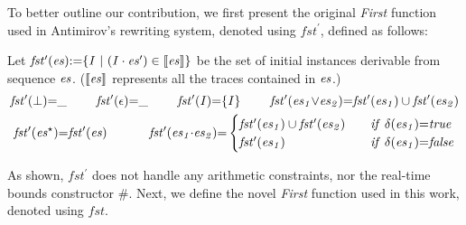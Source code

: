 \documentclass[acmsmall,10pt,review]{acmart}
\newcommand{\es}{\textcolor{black}{\ensuremath{{es}}}}
\newcommand{\seq}{\cdot}
\newcommand{\code}[1]{{\tt{\ensuremath{\m{#1}}}}}
\newcommand{\esn}[2]{\ensuremath{#1^{#2}}}
\newcommand{\empt}{\textcolor{black}{\ensuremath{\epsilon}}}
\newcommand{\bott}{\textcolor{black}{\ensuremath{\bot}}}
\newcommand{\m}{\mathit}
\begin{document}
To better outline our contribution, we first present the original \emph{First} function used in  Antimirov's rewriting system, denoted using \code{fst^\prime}, defined as follows:

\begin{definition}\label{First1}
Let \code{fst^\prime(\es){:=}\{ I\ |\  (I \cdot \es^\prime) \in \llbracket  \es \rrbracket  \}} be the set of initial instances derivable from  sequence \code{\es}. (\code{\llbracket  \es \rrbracket } represents all the traces contained in \code{\es}.)
{ 
 \begin{gather*} 
\code{fst^\prime( \bott) {=} \_ } \qquad\ 
\code{ fst^\prime(\empt) {=} \_} \qquad\ 
\code{fst^\prime( I) {=} \{ I \} }
 \qquad\ 
\code{fst^\prime(  \es_1 {\vee} \es_2) {=} fst^\prime(  \es_1) \cup fst^\prime(  \es_2)}
\\
{
\code{fst^\prime( \esn{\es}{\star} ) {=} fst^\prime({ \es})} 
\qquad\quad\
\code{fst^\prime(\es_1 {\seq} \es_2) {=} } 
\begin{cases}
      \code{\code{fst^\prime(  \es_1)} \cup \code{fst^\prime(  \es_2)} } \quad & \code{ if\ \delta(\es_1) {=} true}\\
      \code{\code{fst^\prime(  \es_1)}} & \code{  if\ \delta(\es_1) {=} false}
    \end{cases} 
    }
\end{gather*}
}
\end{definition}

As shown, \code{fst^\prime} does not handle 
any arithmetic constraints, nor 
the real-time bounds constructor \code{\#}. Next, we define the novel  \emph{First} function used in this work, denoted using \code{fst}. 
\end{document}
